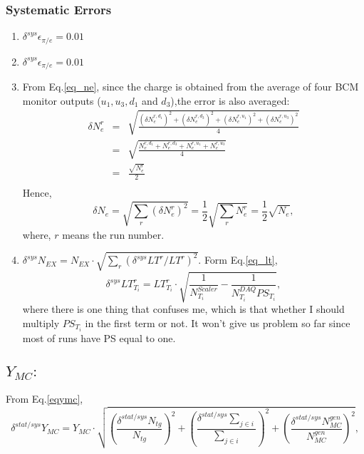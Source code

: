 \subsubsection{Systematic Errors}
\begin{enumerate}

\item $\delta^{sys} \epsilon_{\pi/e} = 0.01$

\item $\delta^{sys} \epsilon_{\pi/e} = 0.01$

\item From Eq.\ref{eq_ne}, since the charge is obtained from the average of four BCM monitor outputs ($u_{1},u_{3},d_{1}$ and $d_{3}$),the error is also averaged:
\begin{eqnarray*}
  \delta N_{e}^{r} &=& \sqrt{\frac{(\delta N_{e}^{r,d_{1}})^{2}+(\delta N_{e}^{r,d_{3}})^{2}+(\delta N_{e}^{r,u_{1}})^{2}+(\delta N_{e}^{r,u_{3}})^{2}}{4}}\\
                  &=& \sqrt{\frac{N_{e}^{r,d_{1}}+N_{e}^{r,d_{3}}+N_{e}^{r,u_{1}}+N_{e}^{r,u_{3}}}{4}}\\
                  &=& \frac{\sqrt{N_{e}^{r}}}{2} \\
\end{eqnarray*}
Hence,
\begin{equation}
  \delta N_{e} = \sqrt{\sum_{r}(\delta N_{e}^{r})^{2}}=\frac{1}{2}\sqrt{\sum_{r}N_{e}^{r}}=\frac{1}{2}\sqrt{N_{e}},
  \label{eq:beam_charge}
\end{equation}
where, $r$ means the run number.

\item $\delta^{sys} N_{EX} = N_{EX} \cdot \sqrt{ \sum_{r} (\delta^{sys} LT^{r}/LT^{r})^{2}}$. Form Eq.\ref{eq_lt},
\begin{equation}
  \delta^{sys} LT^{r}_{T_{i}} = LT^{r}_{T_{i}} \cdot \sqrt{\frac{1}{N_{T_{i}}^{Scaler}}-\frac{1}{N_{T_{i}}^{DAQ} PS_{T_{i}}}},
\end{equation}
where there is one thing that confuses me, which is that whether I should multiply $PS_{T_{i}}$ in the first term or not. It won't give us problem so far since most of runs have PS equal to one.

\end{enumerate}

\subsection{$Y_{MC}:$} 

From Eq.\ref{eqymc},
\begin{equation}
  \delta^{stat/sys} Y_{MC} =  Y_{MC} \cdot \sqrt{(\frac{\delta^{stat/sys} N_{tg}}{N_{tg}})^{2}+(\frac{\delta^{stat/sys}\sum_{j\in i}}{\sum_{j\in i}})^{2}+(\frac{\delta^{stat/sys} N_{MC}^{gen}}{N_{MC}^{gen}})^{2}},
\end{equation}

